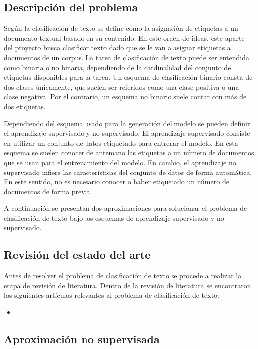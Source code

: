 \subsection{Descripción del problema}
Según \cite{DC_SPRINGER} la clasificación de texto se define como la asignación de etiquetas a un documento textual basado en su contenido. En este orden de ideas, este aparte del proyecto busca clasificar texto dado que se le van a asignar etiquetas a documentos de un corpus. La tarea de clasificación de texto puede ser entendida como binaria o no binaria, dependiendo de la cardinalidad del conjunto de etiquetas disponibles para la tarea. Un esquema de clasificación binario consta de dos clases únicamente, que suelen ser referidos como una clase positiva o una clase negativa. Por el contrario, un esquema no binario suele contar con más de dos etiquetas.

Dependiendo del esquema usado para la generación del modelo se pueden definir el aprendizaje supervisado y no supervisado. El aprendizaje supervisado consiste en utilizar un conjunto de datos etiquetado para entrenar el modelo. En esta esquema se suelen conocer de antemano las etiquetas a un número de documentos que se usan para el entrenamiento del modelo. En cambio, el aprendizaje no supervisado infiere las características del conjunto de datos de forma automática. En este sentido, no es necesario conocer o haber etiquetado un número de documentos de forma previa. 

A continuación se presentan dos aproximaciones para solucionar el problema de clasificación de texto bajo los esquemas de aprendizaje supervisado y no supervisado. 

\subsection{Revisión del estado del arte}
Antes de resolver el problema de clasificación de texto se procede a realizar la etapa de revisión de literatura. Dentro de la revisión de literatura se encontraron los siguientes artículos relevantes al problema de clasificación de texto:

\begin{itemize}
    \item 
\end{itemize}

\subsection{Aproximación no supervisada}


